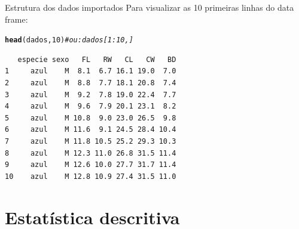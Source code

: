 \documentclass[10pt]{beamer}\usepackage[]{graphicx}\usepackage[]{color}
\makeatletter
\newcommand{\hlnum}[1]{\textcolor[rgb]{0.686,0.059,0.569}{#1}}%
\newcommand{\hlcom}[1]{\textcolor[rgb]{0.498,0.498,0.498}{\textit{#1}}}%
\newcommand{\hlstd}[1]{\textcolor[rgb]{0.345,0.345,0.345}{#1}}%
\newcommand{\hlkwd}[1]{\textcolor[rgb]{0.282,0.239,0.545}{\textbf{#1}}}%
\newenvironment{kframe}{%
 \def\at@end@of@kframe{}%
 \ifinner\ifhmode%
  \def\at@end@of@kframe{\end{minipage}}%
  \begin{minipage}{\columnwidth}%
 \fi\fi%
 \def\FrameCommand##1{\hskip\@totalleftmargin \hskip-\fboxsep
 \colorbox{shadecolor}{##1}\hskip-\fboxsep
     \hskip-\linewidth \hskip-\@totalleftmargin \hskip\columnwidth}%
 \MakeFramed {\advance\hsize-\width
   \@totalleftmargin\z@ \linewidth\hsize
   \@setminipage}}%
 {\par\unskip\endMakeFramed%
 \at@end@of@kframe}
\newenvironment{knitrout}{}{} %
\makeatother
\begin{document}
\begin{frame}[fragile]{Estrutura dos dados importados}
Para visualizar as 10 primeiras linhas do data frame:
\begin{knitrout}\small
{}\color{fgcolor}\begin{kframe}
\begin{alltt}
\hlkwd{head}\hlstd{(dados,} \hlnum{10}\hlstd{)} \hlcom{# ou: dados[1:10,]}
\end{alltt}
\begin{verbatim}
   especie sexo   FL   RW   CL   CW   BD
1     azul    M  8.1  6.7 16.1 19.0  7.0
2     azul    M  8.8  7.7 18.1 20.8  7.4
3     azul    M  9.2  7.8 19.0 22.4  7.7
4     azul    M  9.6  7.9 20.1 23.1  8.2
5     azul    M 10.8  9.0 23.0 26.5  9.8
6     azul    M 11.6  9.1 24.5 28.4 10.4
7     azul    M 11.8 10.5 25.2 29.3 10.3
8     azul    M 12.3 11.0 26.8 31.5 11.4
9     azul    M 12.6 10.0 27.7 31.7 11.4
10    azul    M 12.8 10.9 27.4 31.5 11.0
\end{verbatim}
\end{kframe}
\end{knitrout}

\end{frame}


\section{Estatística descritiva}
\end{document}
